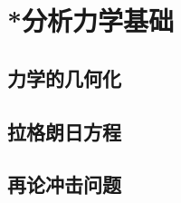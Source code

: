 

\section{*分析力学基础}\label{4-5}

\subsection{力学的几何化}\label{4-5-1}

\subsection{拉格朗日方程}\label{4-5-2}

\subsection{再论冲击问题}\label{4-5-3}